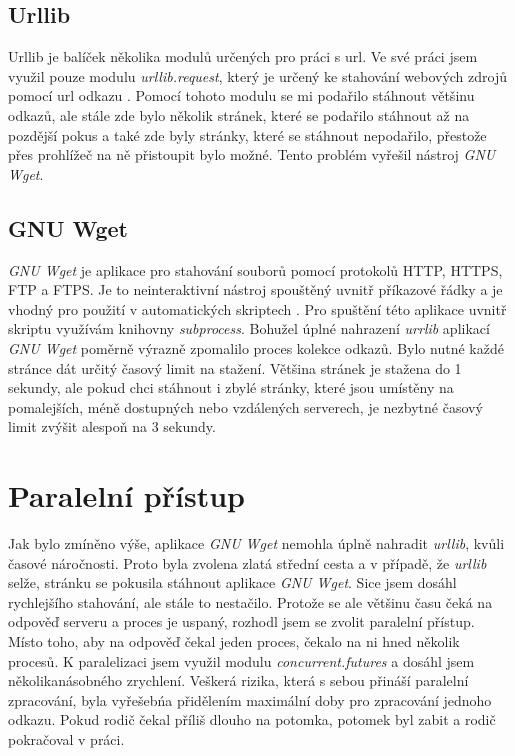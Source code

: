 \label{urllib}
\subsection{Urllib}
Urllib je balíček několika modulů určených pro práci s url. Ve své práci jsem využil pouze modulu \textit{urllib.request},
který je určený ke stahování webových zdrojů pomocí url odkazu \cite{URLLIB}. Pomocí tohoto modulu se mi podařilo stáhnout většinu
odkazů, ale stále zde bylo několik stránek, které se podařilo stáhnout až na pozdější pokus a také zde byly stránky, které
se stáhnout nepodařilo, přestože přes prohlížeč na ně přistoupit bylo možné. Tento problém vyřešil nástroj \textit{GNU Wget}.

\label{wget}
\subsection{GNU Wget}
\textit{GNU Wget} je aplikace pro stahování souborů pomocí protokolů HTTP, HTTPS, FTP a FTPS. Je to neinteraktivní nástroj spouštěný uvnitř
příkazové řádky a je vhodný pro použití v automatických skriptech \cite{WGET}. Pro spuštění této aplikace uvnitř skriptu využívám knihovny \textit{subprocess}.
Bohužel úplné nahrazení \textit{urrlib} aplikací \textit{GNU Wget} poměrně výrazně zpomalilo proces kolekce odkazů. Bylo nutné každé stránce dát určitý časový limit
na stažení. Většina stránek je stažena do 1 sekundy, ale pokud chci stáhnout i zbylé stránky, které jsou umístěny na pomalejších, méně dostupných
nebo vzdálených serverech, je nezbytné časový limit zvýšit alespoň na 3 sekundy.

\section{Paralelní přístup}
Jak bylo zmíněno výše, aplikace \textit{GNU Wget} nemohla úplně nahradit \textit{urllib}, kvůli časové náročnosti. Proto byla zvolena zlatá střední cesta a v případě,
že \textit{urllib} selže, stránku se pokusila stáhnout aplikace \textit{GNU Wget}. Sice jsem dosáhl rychlejšího stahování, ale stále to nestačilo. Protože se ale většinu
času čeká na odpověď serveru a proces je uspaný, rozhodl jsem se zvolit paralelní přístup. Místo toho, aby na odpověď čekal jeden proces, čekalo na ni
hned několik procesů. K paralelizaci jsem využil modulu \textit{concurrent.futures} a dosáhl jsem několikanásobného zrychlení. Veškerá rizika,
která s sebou přináší paralelní zpracování, byla vyřešebńa přidělením maximální doby pro zpracování jednoho odkazu. Pokud rodič čekal příliš
dlouho na potomka, potomek byl zabit a rodič pokračoval v práci.


